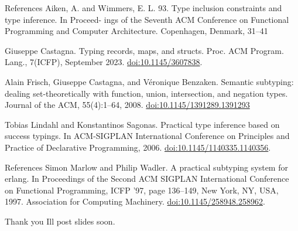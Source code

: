 \documentclass[
  ignorenonframetext,
  aspectratio=169]{beamer}
\begin{document}
\begin{frame}{References}
\label{references}
Aiken, A. and Wimmers, E. L. 93. Type inclusion constraints and type
inference. In Proceed- ings of the Seventh ACM Conference on Functional
Programming and Computer Architecture. Copenhagen, Denmark, 31--41

Giuseppe Castagna. Typing records, maps, and structs. Proc. ACM Program.
Lang., 7(ICFP), September 2023. \url{doi:10.1145/3607838}.

Alain Frisch, Giuseppe Castagna, and Véronique Benzaken. Semantic
subtyping: dealing set-theoretically with function, union, intersection,
and negation types. Journal of the ACM, 55(4):1--64, 2008.
\url{doi:10.1145/1391289.1391293}

Tobias Lindahl and Konstantinos Sagonas. Practical type inference based
on success typings. In ACM-SIGPLAN International Conference on
Principles and Practice of Declarative Programming, 2006.
\url{doi:10.1145/1140335.1140356}.
\end{frame}

\begin{frame}{References}
\label{references-1}
Simon Marlow and Philip Wadler. A practical subtyping system for erlang.
In Proceedings of the Second ACM SIGPLAN International Conference on
Functional Programming, ICFP '97, page 136--149, New York, NY, USA,
1997. Association for Computing Machinery.
\url{doi:10.1145/258948.258962}.
\end{frame}

\begin{frame}{Thank you}
\label{thank-you}
I\textquotesingle ll post slides soon.
\end{frame}
\end{document}
